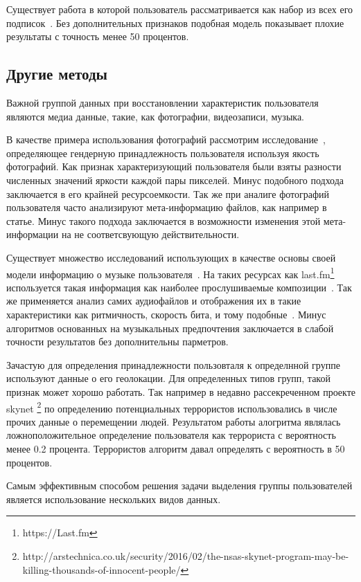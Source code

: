 \documentclass[annotation,times,page4]{itmo-student-thesis}
\begin{document}
Существует работа в которой пользователь рассматривается как набор из всех его подписок~\cite{zheleva2009join,}. Без дополнительных признаков подобная модель показывает плохие результаты с точность менее 50 процентов. 
  
\subsection{Другие методы}
Важной группой данных при восстановлении характеристик пользователя являются медиа данные, такие, как фотографии, видеозаписи, музыка. 

В качестве примера использования фотографий рассмотрим исследование~\cite{baluja2007boosting,}, определяющее гендерную принадлежность пользователя используя якость фотографий. Как признак характеризующий пользователя были взяты разности численных значений яркости каждой пары пикселей. Минус подобного подхода заключается в его крайней ресурсоемкости. Так же при аналиге фотографий пользователя часто анализируют мета-информацию файлов, как например в статье. Минус такого подхода заключается в возможности изменения этой мета-информации на не соответсвующую действительности.

Существует множество исследований использующих в качестве основы своей модели информацию о музыке пользователя~\cite{wu2014gender,liu2012inferring}. На таких ресурсах как last.fm\footnote{https://Last.fm} используется такая информация как наиболее прослушиваемые композиции~\cite{wu2014gender}. Так же применяется анализ самих аудиофайлов и отображения их в такие характеристики как ритмичность, скорость бита, и тому подобные~\cite{liu2012inferring}. Минус алгоритмов основанных на музыкальных предпочтения заключается в слабой точности результатов без дополнительны парметров.

Зачастую для определения принадлежности пользовталя к определнной группе используют данные о его геолокации. Для определенных типов групп, такой признак может хорошо работать. Так например в недавно рассекреченном проекте skynet \footnote{http://arstechnica.co.uk/security/2016/02/the-nsas-skynet-program-may-be-killing-thousands-of-innocent-people/} по определению потенциальных террористов использовались в числе прочих данные о перемещении людей. Результатом работы алогритма являлась ложноположительное определение пользователя как террориста с вероятность менее 0.2 процента. Террористов алгоритм давал определять с вероятность в 50 процентов.

Самым эффективным способом решения задачи выделения группы пользователей является использование нескольких видов данных. 
\end{document}
